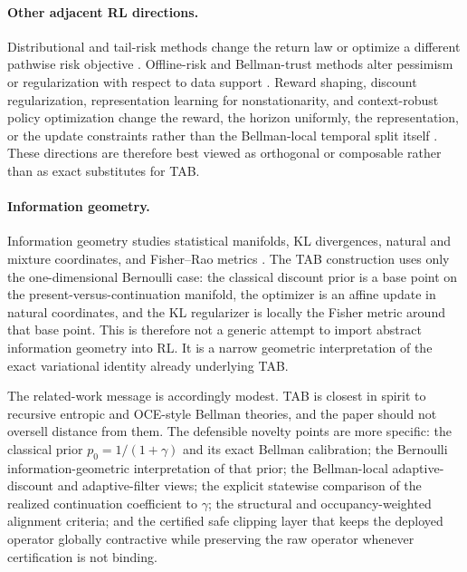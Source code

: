 \documentclass{article}
\theoremstyle{remark}
\begin{document}
\paragraph{Other adjacent RL directions.}
Distributional and tail-risk methods change the return law or optimize a different pathwise risk objective \citep{bellemare2017distributional,dabney2018quantile,bdr2023distributional,wang2023near,chen2024distrl}. Offline-risk and Bellman-trust methods alter pessimism or regularization with respect to data support \citep{kumar2020conservative,kostrikov2022offline,zhang2024riskoffline,luo2025trustbellman}. Reward shaping, discount regularization, representation learning for nonstationarity, and context-robust policy optimization change the reward, the horizon uniformly, the representation, or the update constraints rather than the Bellman-local temporal split itself \citep{rathnam2024discount,ma2024assistant,ramesh2024chunked,lee2024pausing,zhang2024corep,hamadanian2025lcpo}. These directions are therefore best viewed as orthogonal or composable rather than as exact substitutes for TAB.

\paragraph{Information geometry.}
Information geometry studies statistical manifolds, KL divergences, natural and mixture coordinates, and Fisher--Rao metrics \citep{amari2000methods,amari2016information}. The TAB construction uses only the one-dimensional Bernoulli case: the classical discount prior is a base point on the present-versus-continuation manifold, the optimizer is an affine update in natural coordinates, and the KL regularizer is locally the Fisher metric around that base point. This is therefore not a generic attempt to import abstract information geometry into RL. It is a narrow geometric interpretation of the exact variational identity already underlying TAB.

The related-work message is accordingly modest. TAB is closest in spirit to recursive entropic and OCE-style Bellman theories, and the paper should not oversell distance from them. The defensible novelty points are more specific: the classical prior $p_0=1/(1+\gamma)$ and its exact Bellman calibration; the Bernoulli information-geometric interpretation of that prior; the Bellman-local adaptive-discount and adaptive-filter views; the explicit statewise comparison of the realized continuation coefficient to $\gamma$; the structural and occupancy-weighted alignment criteria; and the certified safe clipping layer that keeps the deployed operator globally contractive while preserving the raw operator whenever certification is not binding.
\end{document}
